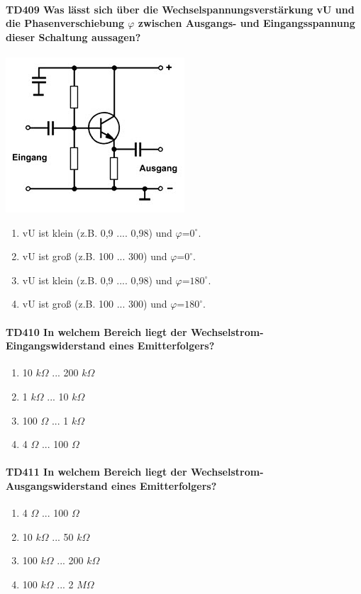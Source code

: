 \documentclass[8pt]{article}
\begin{document}
\begin{enumerate}
\begin{enumerate}[nolistsep,label=\Alph*]
\paragraph*{TD409 Was lässt sich über die Wechselspannungsverstärkung vU und die Phasenverschiebung $\varphi$ zwischen Ausgangs- und Eingangsspannung dieser Schaltung aussagen?}
\begin{center}
	\begin{minipage}{\linewidth}
		\centering
		\includegraphics[scale=1.0]{pics/td409_a.jpg}
	\end{minipage}
\end{center}
\begin{enumerate}[nolistsep,label=\Alph*]
\item vU ist klein (z.B. 0,9 .... 0,98) und $\varphi$=$0^{\circ}$.
\item vU ist groß (z.B. 100 ... 300) und $\varphi$=$0^{\circ}$.
\item vU ist klein (z.B. 0,9 .... 0,98) und $\varphi$=$180^{\circ}$.
\item vU ist groß (z.B. 100 ... 300) und $\varphi$=$180^{\circ}$.
\end{enumerate}

\paragraph*{TD410 In welchem Bereich liegt der Wechselstrom-Eingangswiderstand eines Emitterfolgers?}
\begin{enumerate}[nolistsep,label=\Alph*]
\item 10 $k\Omega$ ... 200 $k\Omega$
\item 1 $k\Omega$ ... 10 $k\Omega$
\item 100 $\Omega$ ... 1 $k\Omega$
\item 4 $\Omega$ ... 100 $\Omega$
\end{enumerate}

\paragraph*{TD411 In welchem Bereich liegt der Wechselstrom-Ausgangswiderstand eines Emitterfolgers?}
\begin{enumerate}[nolistsep,label=\Alph*]
\item 4 $\Omega$ ... 100 $\Omega$
\item 10 $k\Omega$ ... 50 $k\Omega$
\item 100 $k\Omega$ ... 200 $k\Omega$
\item 100 $k\Omega$ ... 2 $M\Omega$
\end{enumerate}


\end{enumerate}
\end{enumerate}
\end{document}
